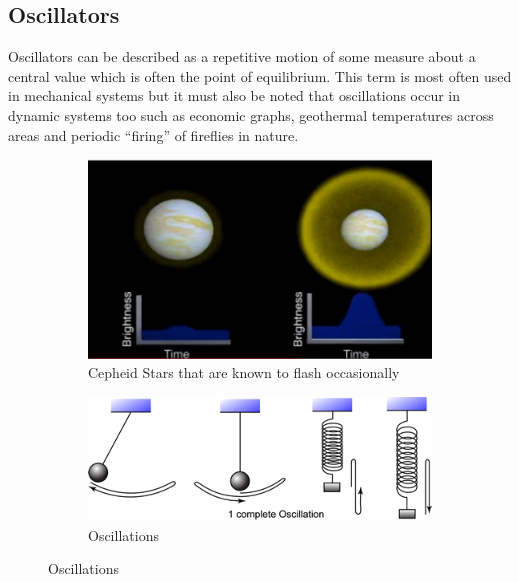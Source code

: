 
\subsection{Oscillators}
Oscillators can be described as a repetitive motion of some measure about a central value which is often the point of equilibrium. This term is most often used in mechanical systems but it must also be noted that oscillations occur in dynamic systems too such as economic graphs, geothermal temperatures across areas and periodic ``firing'' of fireflies in nature. 
\begin{figure}[h!]
  \centering
  \begin{subfigure}[h!]{0.3\textwidth}
    \includegraphics[width=\textwidth]{imgs/cepheid}
    \caption{Cepheid Stars that are known to flash occasionally}
  \end{subfigure}
  \space\space\space
  \begin{subfigure}[h!]{0.5\textwidth}
    \includegraphics[width=\textwidth]{imgs/oscillation}
    \caption{Oscillations}
  \end{subfigure}
  \label{fig:intro_samples}
\end{figure}

